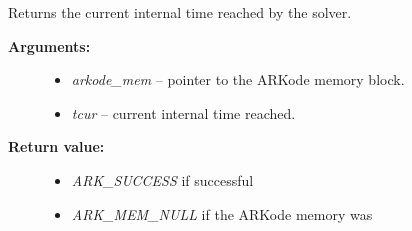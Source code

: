 \documentclass[letterpaper,10pt,english]{sphinxmanual}
\begin{document}

\begin{fulllineitems}
\label{c_interface/User_callable:ARKodeGetCurrentTime}
Returns the current internal time reached by the solver.
\begin{description}
\item[{\textbf{Arguments:}}] \leavevmode\begin{itemize}
\item {} 
\emph{arkode\_mem} -- pointer to the ARKode memory block.

\item {} 
\emph{tcur} -- current internal time reached.

\end{itemize}

\item[{\textbf{Return value:}}] \leavevmode\begin{itemize}
\item {} 
\emph{ARK\_SUCCESS} if successful

\item {} 
\emph{ARK\_MEM\_NULL} if the ARKode memory was 

\end{itemize}

\end{description}

\end{fulllineitems}

\end{document}
